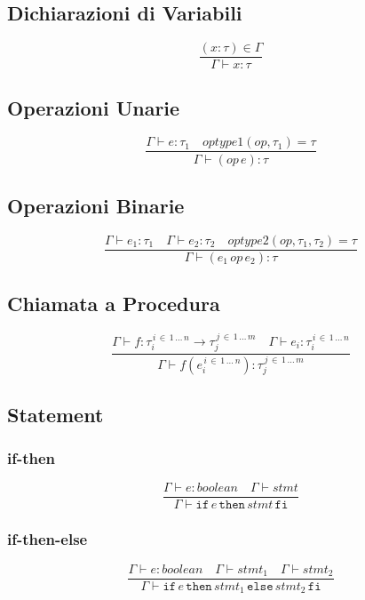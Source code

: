 \documentclass[a4paper,12pt]{article}
\newcommand\resw[1]{\mathtt{#1}}
\newcommand\mi[1]{\mathit{#1}}
\begin{document}
    \subsection{Dichiarazioni di Variabili}
    \[
        \frac{(x \colon \tau) \in \Gamma}{\Gamma \vdash x \colon \tau}
    \]
    \subsection{Operazioni Unarie}
    \[
        \frac {\Gamma \vdash \mi{e} \colon \tau_1 \quad optype1(op,\tau_1) = \tau} %
              {\Gamma \vdash (op \, \mi{e}) \colon \tau}
    \]
    \subsection{Operazioni Binarie}
    \[
        \frac {\Gamma \vdash \mi{e_1} \colon \tau_1 \quad \Gamma \vdash \mi{e_2} \colon \tau_2  \quad optype2(op,\tau_1, \tau_2) = \tau} %
        {\Gamma \vdash (\mi{e_1}\, op \, \mi{e_2}) \colon \tau}
    \]
    \subsection{Chiamata a Procedura}
    \[
        \frac {\Gamma \vdash \mi{f} \colon \tau_i^{\,i \, \in \,1 \, \dots \, n} \to \tau_j^{\,j \, \in \, 1 \, \dots \, m} \quad \Gamma \vdash \mi{e_i} \colon %
        \tau_i^{\, i \, \in \, 1 \, \dots \, n}} %
        {\Gamma \vdash \mi{f}(\mi{e}_i^{\, i \, \in \, 1 \, \dots \, n})\colon \tau_j^{\, j \, \in \, 1 \, \dots \, m}}
    \]
    
    \subsection{Statement}
    	\subsubsection{if-then}
	\[
		\frac{\Gamma \vdash \mi{e} \colon boolean \quad \Gamma \vdash \mi{stmt}}%
		{\Gamma \vdash \resw{if} \, \mi{e} \, \resw{then} \, \mi{stmt} \, \resw{fi}}
	\]
	\subsubsection{if-then-else}
	\[
		\frac{\Gamma \vdash \mi{e} \colon boolean \quad \Gamma \vdash \mi{stmt}_{1} \quad \Gamma \vdash \mi{stmt}_{2}}%
		{\Gamma \vdash \resw{if} \, \mi{e} \, \resw{then} \, \mi{stmt}_{1} \, \resw{else} \, \mi{stmt}_{2} \, \resw{fi}}
	\]
\end{document}
